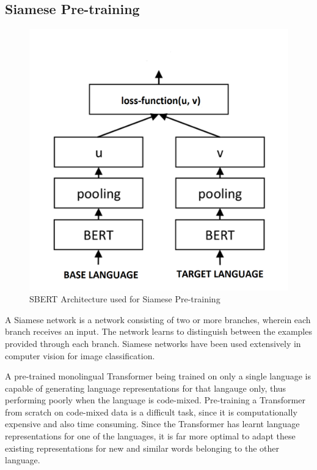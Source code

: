 \documentclass[conference]{IEEEtran}
\begin{document}
\subsection{Siamese Pre-training}

\begin{figure}
    \centering
    \includegraphics[scale=0.35]{img/sbert-architecture.png}
    \caption{SBERT Architecture used for Siamese Pre-training}
    \label{fig:my_label}
\end{figure}

A Siamese network is a network consisting of two or more branches, wherein each branch receives an input. The network learns to distinguish between the examples provided through each branch. Siamese networks have been used extensively in computer vision for image classification.

A pre-trained monolingual Transformer being trained on only a single language is capable of generating language representations for that langauge only, thus performing poorly when the language is code-mixed. Pre-training a Transformer from scratch on code-mixed data is a difficult task, since it is computationally expensive and also time consuming. Since the Transformer has learnt language representations for one of the languages, it is far more optimal to adapt these existing representations for new and similar words belonging to the other language.
\end{document}
